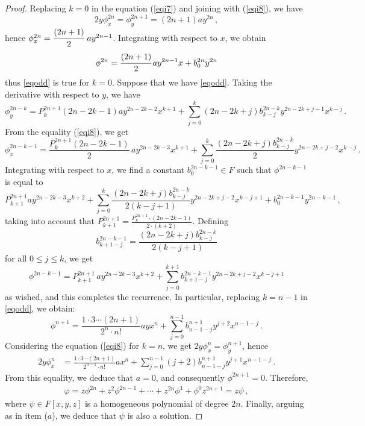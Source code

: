 \documentclass[10pt,a4paper]{amsart}
\begin{document}
\begin{proof}
	Replacing $k=0$ in the equation (\ref{eqi7}) and joining with  (\ref{eqi8}), we have
	\begin{equation*} 
		2y\phi^{2n}_x=\phi^{2n+1}_y=(2n+1)ay^{2n}\,,
	\end{equation*} 
	hence $\phi_x^{2n}=\cfrac{(2n+1)}{2}\, \, ay^{2n-1}$.
	Integrating with respect to $x$, we obtain
	\begin{equation*}
		\phi^{2n}=\cfrac{(2n+1)}{2}\,a y^{2n-1}x+b^{2n}_{0}y^{2n}
	\end{equation*}
	thus \eqref{eqodd} is true for $k=0$. 
	Suppose that we have \eqref{eqodd}. Taking the derivative with respect to $y$, we have
	$$\phi^{2n-k}_y=P^{2n+1}_{k}(2n-2k-1)ay^{2n-2k-2}x^{k+1}+\sum_{j=0}^{k}(2n-2k+j)b^{2n-k}_{k-j}y^{2n-2k+j-1}x^{k-j}\,.$$
	From the equality (\ref{eqi8}), we get 
	$$\phi^{2n-k-1}_x=\frac{P^{2n+1}_{k} (2n-2k-1)}{2}\, ay^{2n-2k-3}x^{k+1}+\sum_{j=0}^{k}\frac{(2n-2k+j)b^{2n-k}_{k-j}}{2}y^{2n-2k+j-2}x^{k-j}\,.$$
	Integrating with respect to $x$, we find a constant $b^{2n-k-1}_{0}\in F$ such that $\phi^{2n-k-1}$ is equal to
	$$P^{2n+1}_{k+1}ay^{2n-2k-3}x^{k+2}+\sum_{j=0}^{k}\frac{(2n-2k+j)b^{2n-k}_{k-j}}{2(k-j+1)}y^{2n-2k+j-2}x^{k-j+1}+b^{2n-k-1}_{0}y^{2n-k-1}\,,$$
	taking into account that $ \displaystyle P^{2n+1}_{k+1}=\frac{P^{2n+1}_{k}\cdot (2n-2k-1)}{2\cdot (k+2)}$. Defining $$\displaystyle b^{2n-k-1}_{k+1-j}=\frac{(2n-2k+j)b^{2n-k}_{k-j}}{2(k-j+1)}$$ for all $0\leq j\leq k $, we get
	$$\phi^{2n-k-1}=P^{2n+1}_{k+1}\, ay^{2n-2k-3}x^{k+2}+\sum_{j=0}^{k+1}b^{2n-k-1}_{k+1-j}y^{2n-2k+j-2}x^{k-j+1}$$
	as wished, and this completes the recurrence. In particular, replacing $k=n-1$ in \eqref{eqodd}, we obtain:
	\begin{equation*}
		\phi^{n+1}=\frac{1\cdot 3\cdots (2n+1)}{2^{n}\cdot n!}ayx^{n}+\sum_{j=0}^{n-1}b^{n+1}_{n-1-j}y^{j+2}x^{n-1-j}\,.
	\end{equation*}
	Considering the equation (\ref{eqi8}) for  $k=n$,  we get $2y\phi^{n}_x=\phi^{n+1}_y$, hence
	\begin{align}%
		2y\phi^{n}_x&=\frac{1\cdot 3\cdots (2n+1)}{2^{n-1}\cdot n!}ax^{n}+\sum_{j=0}^{n-1}(j+2)b^{n+1}_{n-1-j}y^{j+1}x^{n-1-j}\,.
	\end{align}
	From this equality, we deduce that $a=0$, and consequently $\phi^{2n+1}=0$. Therefore,
	\begin{align*}
		\varphi=z\phi^{2n}+z^2\phi^{2n-1}+\cdots+ z^{2n}\phi^{1}+\phi^0 z^{2n+1}=z\psi\,,
	\end{align*}
	where $\psi\in F[x,y,z]$  is a homogeneous polynomial  of degree $2n$. Finally, arguing as in item ($a$), we deduce that $\psi$ is also a solution.
	
\end{proof}
\end{document}
